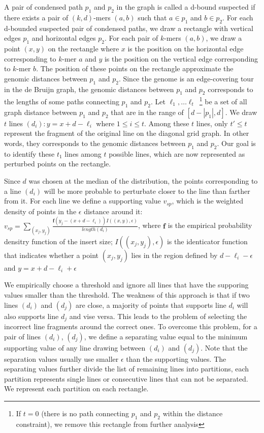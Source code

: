 \documentclass[a4paper]{article}
\begin{document}
A pair of condensed path $p_1$ and $p_2$ in the graph is called a d-bound suspected if there exists 
a pair of $(k,d)$-mers $(a,b)$ such that $a \in p_1$ and $b\in p_2$. For each d-bounded suspected pair of condensed paths, we draw a rectangle with
vertical edges $p_1$ and horizontal edges $p_2$. For each pair of $k$-mers $(a,b)$, we draw a point $(x,y)$  on the rectangle 
where $x$ is the position on the horizontal edge corresponding to $k$-mer $a$ and $y$ is the position on the vertical edge 
corresponding to $k$-mer $b$. The position of these points on the rectangle approximate the genomic  distances between $p_1$ 
and $p_2$. Since the genome is an edge-covering tour in the de Bruijn graph,  the genomic distances between $p_1$ and $p_2$ corresponds to
the lengths of some paths connecting $p_1$ and $p_2$. Let ${\ell_1, \ldots \ell_t}$~\footnote{ If $t = 0$ (there is no path
connecting $p_1$ and $p_2$ within the distance constraint), we remove this rectangle from further analysis} be a set of all graph distance between 
$p_1$ and $p_2$ that are in the range of $[d - |p_1|, d]$.  We draw $t$ lines  $(d_i): y = x + d - \ell_i$ where $ 1 \leq i \leq t$.  Among 
 these $t$ lines, only $t' \leq t$ represent the fragment of the original line on the diagonal grid graph. In other words, 
    they corresponds to the genomic distances between $p_1$ and $p_2$. 
 Our goal is to identify 
these $t_1$ lines among $t$ possible lines, which are now represented as perturbed points on the rectangle.


Since $d$ was chosen at the median of the distribution, the points corresponding to a line $(d_i)$ will be more probable 
to perturbate closer to the line than farther from it. For each line we define a supporting value $v_{sp}$, which is the weighted density of 
points in the $\epsilon$ distance around it: $v_{sp} = \sum_{(x_j,y_j)}\frac{ \mathbf{f}(y_j - (x + d - \ell_i) ) I((x,y), \epsilon) }{length(d_i)}$, where
$\mathbf{f}$ is the empirical probability densitry function of the insert size; $I((x_j,y_j), \epsilon)$ 
is the identicator function that indicates whether a point $(x_j,y_j)$
lies in the region defined by $d - \ell_i - \epsilon$ and $y = x + d - \ell_i + \epsilon$


We empirically choose a threshold and ignore all lines that have the supporing values smaller than the threshold. The weakness of this approach is that 
if two lines $(d_i)$ and $(d_j)$ are close, a majority of points that supports line $d_i$ will also supports line $d_j$ and vise versa.  
This leads to the problem of selecting the incorrect line fragments around the correct ones. To overcome this problem, for a pair of 
lines $(d_i)$, $(d_j)$, we define a separating value equal to the minimum supporting value of any line drawing between $(d_i)$ and $(d_j)$.
Note that the separation values usually use smaller $\epsilon$ than  the supporting values.  The separating values further divide the 
list of remaining lines into partitions, each partition represents single lines or consecutive lines that can not be separated. We 
represent each partition on each rectangle. 
\end{document}
